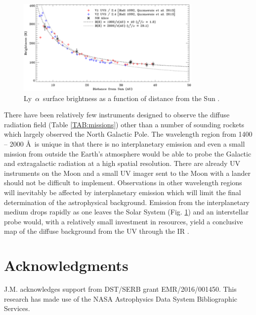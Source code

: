 \documentclass{iau}
\newcommand{\lya}{Ly~$\alpha$}
\begin{document}
\begin{figure}[t]
\begin{center}
 \includegraphics[width=0.8\textwidth]{gladstone_lya.png} 
 \caption{\lya\ surface brightness as a function of distance from the Sun \citep{Gladstone_lya2018}.}
  \label{Fig:lya_fluxes}
\end{center}
\end{figure}

There have been relatively few instruments designed to observe the diffuse radiation field (Table \ref{TAB:missions}) other than a number of sounding rockets which largely observed the North Galactic Pole. The wavelength region from 1400 -- 2000 \AA\ is unique in that there is no interplanetary emission and even a small mission from outside the Earth's atmosphere would be able to probe the Galactic and extragalactic radiation at a high spatial resolution. There are already UV instruments on the Moon \citep{Cao_moon2011} and a small UV imager sent to the Moon with a lander should not be difficult to implement. Observations in other wavelength regions will inevitably be affected by interplanetary emission which will limit the final determination of the astrophysical background. Emission from the interplanetary medium drops rapidly as one leaves the Solar System (Fig. \ref{Fig:lya_fluxes}) and an interstellar probe would, with a relatively small investment in resources, yield a conclusive map of the diffuse background from the UV through the IR \citep{zemcov_nh2018}. 



\section{Acknowledgments}
J.M. acknowledges support from DST/SERB grant EMR/2016/001450. This research has made use of the NASA Astrophysics Data System Bibliographic Services.
\end{document}
